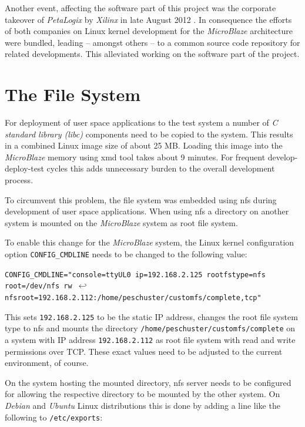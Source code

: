 Another event, affecting the software part of this project was the corporate takeover of \textit{PetaLogix} by \textit{Xilinx} in late August 2012 \cite{takeover}. In consequence the efforts of both companies on Linux kernel development for the \textit{MicroBlaze} architecture were bundled, leading -- amongst others -- to a common source code repository for related developments. This alleviated working on the software part of the project.

\section{The File System}

For deployment of user space applications to the test system a number of \textit{C standard library (libc)} components need to be copied to the system. This results in a combined Linux image size of about 25 MB. Loading this image into the \textit{MicroBlaze} memory using \gls{xmd} tool takes about 9 minutes. For frequent develop-deploy-test cycles this adds unnecessary burden to the overall development process.

To circumvent this problem, the file system was embedded using \gls{nfs} during development of user space applications. When using \gls{nfs} a directory on another system is mounted on the \textit{MicroBlaze} system as root file system.

To enable this change for the \textit{MicroBlaze} system, the Linux kernel configuration option \texttt{CONFIG\_CMDLINE} needs to be changed to the following value:

\texttt{CONFIG\_CMDLINE="console=ttyUL0 ip=192.168.2.125 rootfstype=nfs root=/dev/nfs rw $ \hookleftarrow$\\  nfsroot=192.168.2.112:/home/peschuster/customfs/complete,tcp"} %

This sets \texttt{192.168.2.125} to be the static IP address, changes the root file system type to \gls{nfs} and mounts the directory \texttt{/home/peschuster/customfs/complete} on a system with IP address \texttt{192.168.2.112} as root file system with read and write permissions over TCP. These exact values need to be adjusted to the current environment, of course.

On the system hosting the mounted directory, \gls{nfs} server needs to be configured for allowing the respective directory to be mounted by the other system. On \textit{Debian} and \textit{Ubuntu} Linux distributions this is done by adding a line like the following to \texttt{/etc/exports}: 

